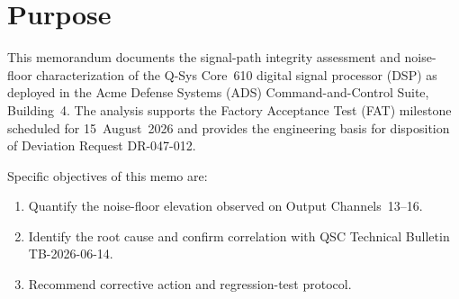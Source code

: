 \section{Purpose}

This memorandum documents the signal-path integrity assessment and noise-floor
characterization of the Q-Sys Core~610 digital signal processor (DSP) as deployed
in the Acme Defense Systems (ADS) Command-and-Control Suite, Building~4. The
analysis supports the Factory Acceptance Test (FAT) milestone scheduled for
15~August~2026 and provides the engineering basis for disposition of Deviation
Request DR-047-012.

Specific objectives of this memo are:
\begin{enumerate}[leftmargin=*, label=\textcolor{accent}{\textbf{(\arabic*)}}, nosep, before=\vspace{2pt}, after=\vspace{0pt}]
  \item Quantify the noise-floor elevation observed on Output Channels~13--16.
  \item Identify the root cause and confirm correlation with QSC Technical
        Bulletin TB-2026-06-14.
  \item Recommend corrective action and regression-test protocol.
\end{enumerate}

